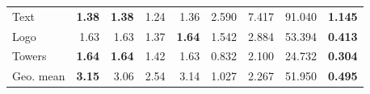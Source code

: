 \begin{tabular}{l rrrr|rrrr}
Text & \cellcolor{estitchHighlight!9}\textbf{1.38} & \cellcolor{estitchHighlight!9}\textbf{1.38} & \cellcolor{ecorange!9}1.24 & \cellcolor{ecblue!9}1.36 & \cellcolor{estitchHighlight!9}2.590 & \cellcolor{estitchHighlight!9}7.417 & \cellcolor{ecorange!9}91.040 & \cellcolor{ecblue!9}\textbf{1.145} \\
Logo & \cellcolor{estitchHighlight!9}1.63 & \cellcolor{estitchHighlight!9}1.63 & \cellcolor{ecorange!9}1.37 & \cellcolor{ecblue!9}\textbf{1.64} & \cellcolor{estitchHighlight!9}1.542 & \cellcolor{estitchHighlight!9}2.884 & \cellcolor{ecorange!9}53.394 & \cellcolor{ecblue!9}\textbf{0.413} \\
Towers & \cellcolor{estitchHighlight!9}\textbf{1.64} & \cellcolor{estitchHighlight!9}\textbf{1.64} & \cellcolor{ecorange!9}1.42 & \cellcolor{ecblue!9}1.63 & \cellcolor{estitchHighlight!9}0.832 & \cellcolor{estitchHighlight!9}2.100 & \cellcolor{ecorange!9}24.732 & \cellcolor{ecblue!9}\textbf{0.304} \\
\midrule
Geo. mean & \cellcolor{estitchHighlight!9}\textbf{3.15} & \cellcolor{estitchHighlight!9}3.06 & \cellcolor{ecorange!9}2.54 & \cellcolor{ecblue!9}3.14 & \cellcolor{estitchHighlight!9}1.027 & \cellcolor{estitchHighlight!9}2.267 & \cellcolor{ecorange!9}51.950 & \cellcolor{ecblue!9}\textbf{0.495} \\
\bottomrule
\end{tabular}
